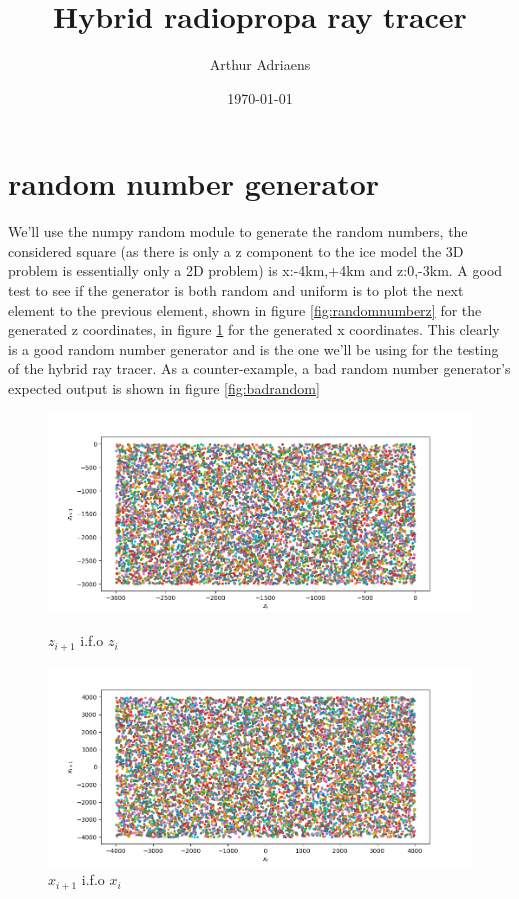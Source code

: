 \documentclass{article}
\title{Hybrid radiopropa ray tracer}
\author{Arthur Adriaens}
\date{\today}
\begin{document}
	\maketitle
\section{random number generator}
We'll use the numpy random module to generate the random numbers, the
considered square (as there is only a z component to the ice model the 3D
problem is essentially only a 2D problem) is x:-4km,+4km and z:0,-3km. A good
test to see if the generator is both random and uniform is to plot the next
element to the previous element, shown in figure \ref{fig:randomnumberz} for
the generated z coordinates,
in figure \ref{fig:randomnumberx} for the generated x coordinates.
This clearly is a good random number generator and is the one we'll be using
for the testing of the hybrid ray tracer.  As a counter-example, a bad random
number generator's expected output is shown in figure \ref{fig:badrandom}

\begin{figure}[ht]
  \centering
  \begin{minipage}[b]{0.49\textwidth}
    \includegraphics[width=\textwidth]{figures/randomnumberz.png}
    \caption{$z_{i+1}$ i.f.o $z_i$}
    \label{fig:randomnumberz}
  \end{minipage}
  \hfill
  \begin{minipage}[b]{0.49\textwidth}
    \includegraphics[width=\textwidth]{figures/randomnumberx.png}
    \caption{$x_{i+1}$ i.f.o $x_i$}
    \label{fig:randomnumberx}
  \end{minipage}
\end{figure}
\end{document}
